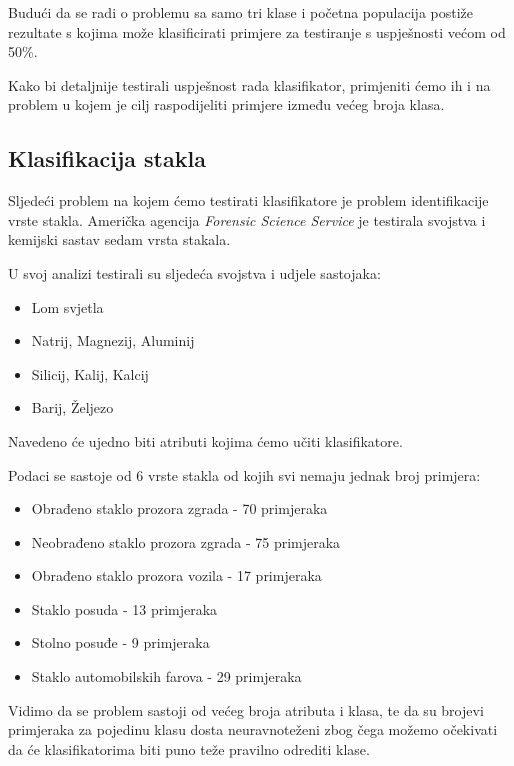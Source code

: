 \documentclass[times, utf8, zavrsni]{fer}
\begin{document}
Budući da se radi o problemu sa samo tri klase i početna populacija postiže rezultate s kojima može klasificirati primjere za testiranje s uspješnosti većom od 50\%.

Kako bi detaljnije testirali uspješnost rada klasifikator, primjeniti ćemo ih i na problem u kojem je cilj raspodijeliti primjere između većeg broja klasa.


\subsection{Klasifikacija stakla}

Sljedeći problem na kojem ćemo testirati klasifikatore je problem identifikacije vrste stakla. Američka agencija \textit{Forensic Science Service} je testirala svojstva i kemijski sastav sedam vrsta stakala.

U svoj analizi testirali su sljedeća svojstva i udjele sastojaka:
\begin{itemize}
\item Lom svjetla
\item Natrij, Magnezij, Aluminij
\item Silicij, Kalij, Kalcij
\item Barij, Željezo

\end{itemize}

Navedeno će ujedno biti atributi kojima ćemo učiti klasifikatore.

Podaci se sastoje od 6 vrste stakla od kojih svi nemaju jednak broj primjera:

\begin{itemize}
\item Obrađeno staklo prozora zgrada - 70 primjeraka
\item Neobrađeno staklo prozora zgrada - 75 primjeraka
\item Obrađeno staklo prozora vozila - 17 primjeraka
\item Staklo posuda - 13 primjeraka
\item Stolno posuđe - 9 primjeraka
\item Staklo automobilskih farova - 29 primjeraka

\end{itemize}

Vidimo da se problem sastoji od većeg broja atributa i klasa, te da su brojevi primjeraka za pojedinu klasu dosta neuravnoteženi zbog čega možemo očekivati da će klasifikatorima biti puno teže pravilno odrediti klase.
\end{document}
